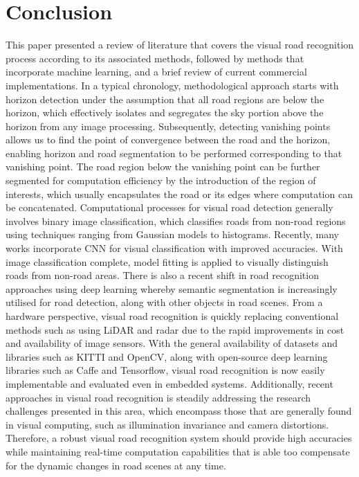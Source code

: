 \section{Conclusion} \label{secconclusion}
This paper presented a review of literature that covers the visual road recognition process according to its associated methods, followed by methods that incorporate machine learning, and a brief review of current commercial implementations. In a typical chronology, methodological approach starts with horizon detection under the assumption that all road regions are below the horizon, which effectively isolates and segregates the sky portion above the horizon from any image processing. Subsequently, detecting vanishing points allows us to find the point of convergence between the road and the horizon, enabling horizon and road segmentation to be performed corresponding to that vanishing point. The road region below the vanishing point can be further segmented for computation efficiency by the introduction of the region of interests, which usually encapsulates the road or its edges where computation can be concatenated. Computational processes for visual road detection generally involves binary image classification, which classifies roads from non-road regions using techniques ranging from Gaussian models to histograms. Recently, many works incorporate CNN for visual classification with improved accuracies. With image classification complete, model fitting is applied to visually distinguish roads from non-road areas. There is also a recent shift in road recognition approaches using deep learning whereby semantic segmentation is increasingly utilised for road detection, along with other objects in road scenes. From a hardware perspective, visual road recognition is quickly replacing conventional methods such as using LiDAR and radar due to the rapid improvements in cost and availability of image sensors. With the general availability of datasets and libraries such as KITTI and OpenCV, along with open-source deep learning libraries such as Caffe and Tensorflow, visual road recognition is now easily implementable and evaluated even in embedded systems. Additionally, recent approaches in visual road recognition is steadily addressing the research challenges presented in this area, which encompass those that are generally found in visual computing, such as illumination invariance and camera distortions. Therefore, a robust visual road recognition system should provide high accuracies while maintaining real-time computation capabilities that is able too compensate for the dynamic changes in road scenes at any time.

